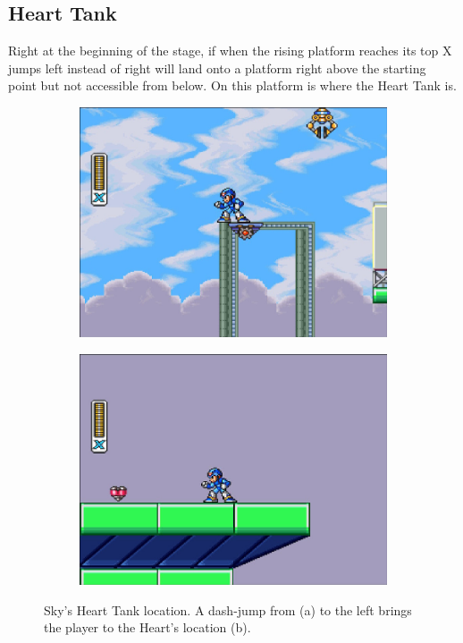 \subsection{Heart Tank}
Right at the beginning of the stage, if when the rising platform reaches its top X jumps left instead of right will land onto a platform right above the starting point but not accessible from below. On this platform is where the Heart Tank is.
\begin{figure}[htp]
	\centering
	\begin{subfigure}{0.4\linewidth}
		\centering
		\includegraphics[width=\linewidth]{figures/X1/Storm_eagle/Storm_heart_1.jpg}
		\caption{}
	\end{subfigure}
	\begin{subfigure}{0.4\linewidth}
		\centering
		\includegraphics[width=\linewidth]{figures/X1/Storm_eagle/Storm_heart_2.jpg}
		\caption{}
	\end{subfigure}
	\caption{Sky's Heart Tank location. A dash-jump from (a) to the left brings the player to the Heart's location (b).}
\end{figure}


